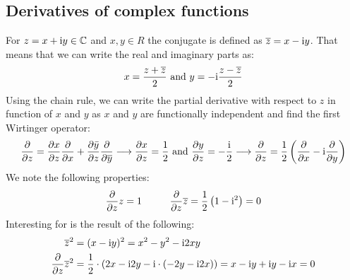 \subsection{Derivatives of complex functions}
For $z = x + {\rm{i}} y \in {\mathbb{C}}$ and $x,y \in R$ the conjugate is defined as $\overline{z} = x - {\rm{i}} y$. That means that we can write the real and imaginary parts as:
\begin{align*}
x = \frac{z + \overline{z}}{2} \text{  and   }   y = -{\rm{i}} \frac{z - \overline{z}}{2}
\end{align*}
Using the chain rule, we can write the partial derivative with respect to $z$ in function of $x$ and $y$ as $x$ and $y$ are functionally independent and find the first Wirtinger operator:
\begin{align*}
\frac{\partial}{\partial z} =\frac{\partial x}{\partial z} \frac{\partial}{\partial x}+\frac{\partial \bar{y}}{\partial z} \frac{\partial}{\partial \overline{y}} 
\longrightarrow \frac{\partial x}{\partial z} = \frac{1}{2} \text{   and   } \frac{\partial y}{\partial z} =  - \frac{{\rm{i}}}{2} 
\longrightarrow \frac{\partial}{\partial z} = \frac{1}{2}\left(\frac{\partial}{\partial x} - {\rm{i}} \frac{\partial}{\partial y}\right)
\end{align*}
We note the following properties:
\begin{align*}
\frac{\partial}{\partial z} z = 1 \hspace{10mm} \frac{\partial}{\partial z}\overline{z} = \frac{1}{2}\left(1 - \ic^2 \right) = 0
\end{align*}
Interesting for is the result of the following: 
\begin{align*}
\overline{z}^2 &= (x - {\rm{i}} y)^2 = x^2 - y^2 - {\rm{i}} 2xy \\
\frac{\partial}{\partial z} \overline{z}^2 &=  \frac{1}{2}\cdot(2x -{\rm{i}} 2y - {\rm{i}}\cdot(-2y -{\rm{i}} 2x)) = x -{\rm{i}} y + {\rm{i}} y -{\rm{i}} x = 0
\end{align*}



